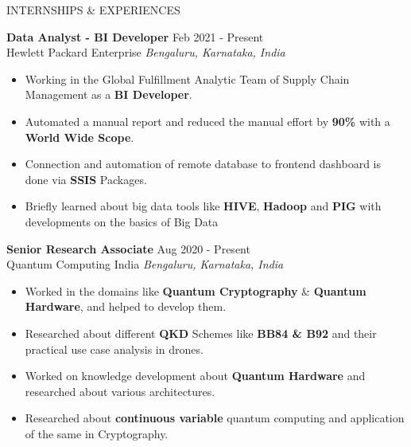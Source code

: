 \documentclass{resume} %
\begin{document}
\begin{rSection}{INTERNSHIPS \& EXPERIENCES}

\textbf{Data Analyst - BI Developer} \hfill Feb 2021 - Present\\
Hewlett Packard Enterprise \hfill \textit{Bengaluru, Karnataka, India}
 \begin{itemize}
    \itemsep -3pt {} 
     \item Working in the Global Fulfillment Analytic Team of Supply Chain Management as a \textbf{BI Developer}.
     \item Automated a manual report and reduced the manual effort by \textbf{90\%} with a \textbf{World Wide Scope}. 
     
    \item Connection and automation of remote database to frontend dashboard is done via \textbf{SSIS} Packages.
    \item Briefly learned about big data tools like \textbf{HIVE}, \textbf{Hadoop} and \textbf{PIG} with developments on the basics of Big Data
    
 
 \end{itemize}
 
\textbf{Senior Research Associate} \hfill Aug 2020 - Present\\
Quantum Computing India \hfill \textit{Bengaluru, Karnataka, India}
 \begin{itemize}
    \itemsep -3pt {} 
     \item  Worked in the domains like \textbf{Quantum Cryptography} \& \textbf{Quantum Hardware}, and helped to develop them.
     \item Researched about different \textbf{QKD} Schemes like \textbf{BB84 \& B92} and their practical use case analysis in drones.
     \item Worked on knowledge development about \textbf{Quantum Hardware} and researched about various architectures.
     \item Researched about \textbf{continuous variable} quantum computing and application of the same in Cryptography.
 \end{itemize}

\end{rSection} 

\end{document}
